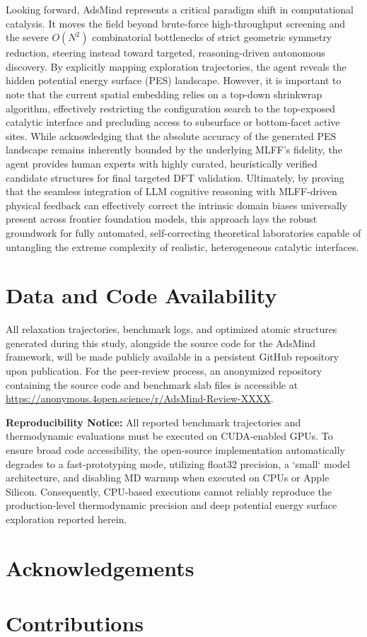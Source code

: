 \documentclass{article}
\begin{document}
Looking forward, AdsMind represents a critical paradigm shift in computational catalysis. It moves the field beyond brute-force high-throughput screening and the severe $O(N^2)$ combinatorial bottlenecks of strict geometric symmetry reduction, steering instead toward targeted, reasoning-driven autonomous discovery. By explicitly mapping exploration trajectories, the agent reveals the hidden potential energy surface (PES) landscape. However, it is important to note that the current spatial embedding relies on a top-down shrinkwrap algorithm, effectively restricting the configuration search to the top-exposed catalytic interface and precluding access to subsurface or bottom-facet active sites. While acknowledging that the absolute accuracy of the generated PES landscape remains inherently bounded by the underlying MLFF's fidelity, the agent provides human experts with highly curated, heuristically verified candidate structures for final targeted DFT validation. Ultimately, by proving that the seamless integration of LLM cognitive reasoning with MLFF-driven physical feedback can effectively correct the intrinsic domain biases universally present across frontier foundation models, this approach lays the robust groundwork for fully automated, self-correcting theoretical laboratories capable of untangling the extreme complexity of realistic, heterogeneous catalytic interfaces.

\section*{Data and Code Availability}
All relaxation trajectories, benchmark logs, and optimized atomic structures generated during this study, alongside the source code for the AdsMind framework, will be made publicly available in a persistent GitHub repository upon publication. For the peer-review process, an anonymized repository containing the source code and benchmark slab files is accessible at \url{https://anonymous.4open.science/r/AdsMind-Review-XXXX}.

\textbf{Reproducibility Notice:} All reported benchmark trajectories and thermodynamic evaluations must be executed on CUDA-enabled GPUs. To ensure broad code accessibility, the open-source implementation automatically degrades to a fast-prototyping mode, utilizing float32 precision, a `small` model architecture, and disabling MD warmup when executed on CPUs or Apple Silicon. Consequently, CPU-based executions cannot reliably reproduce the production-level thermodynamic precision and deep potential energy surface exploration reported herein.

\section*{Acknowledgements}

\section*{Contributions}

{\sloppy


}
\end{document}
